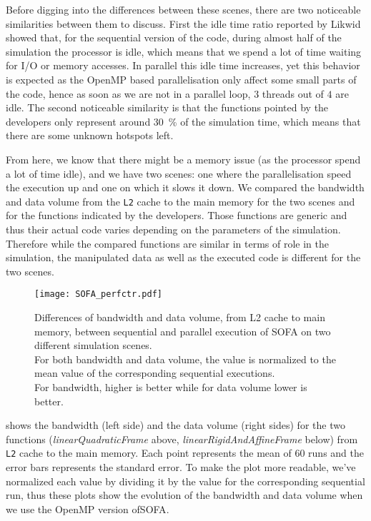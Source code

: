 Before digging into the differences between these scenes, there are two
noticeable similarities between them to discuss. First the idle time ratio
reported by \gls{Likwid} showed
that, for the sequential version of the code, during almost half of the
simulation the processor is idle, which means that we spend a lot of time
waiting for \gls{I/O} or memory accesses. In parallel  this idle time
increases, yet this behavior is expected as the \gls{OpenMP} based
parallelisation only affect some small parts of the code, hence as soon as we
are not in a parallel loop, $3$ threads out of $4$ are idle. The second
noticeable similarity is that the functions pointed by the developers only represent
around \SI{30}{\%} of the simulation time, which means that there are some
unknown hotspots left.

From here, we know that there might be a memory issue (as the processor spend
a lot of time idle), and we have two scenes: one where the parallelisation speed
the execution up and one on which it slows it down. We compared the bandwidth
and data volume from the \texttt{L2} cache to the main memory for the two
scenes and for the functions indicated by the developers. Those functions are
generic and thus their actual code varies depending on the parameters of the
simulation. Therefore while the compared functions are similar in terms of
role in the simulation, the manipulated data as well as the executed code is
different for the two scenes.

\begin{figure}[htb]
    \centering
    \texttt{[image: SOFA\_perfctr.pdf]}
    \caption[SOFA likwid results]{Differences of bandwidth and data volume, from L2 cache to main
        memory, between sequential and parallel execution of \gls{SOFA} on two
        different simulation scenes.
        \\
        For both bandwidth and data volume, the value is normalized to the
        mean value of the corresponding sequential executions.
        \\
        For bandwidth, higher is better while for data volume lower is better.
    }
    \label{fig:SOFA-perfctr}
\end{figure}

 shows the bandwidth (left side) and the data volume (right
sides) for the two functions (\emph{linearQuadraticFrame} above,
\emph{linearRigidAndAffineFrame} below) from \texttt{L2} cache to the main
memory. Each point represents the mean of $60$ runs and the error bars
represents the standard error. To make the plot more readable, we've
normalized each value by dividing it by the value for the corresponding
sequential run, thus these plots show the evolution of the bandwidth and data
volume when we use the \gls{OpenMP} version of\gls{SOFA}.

